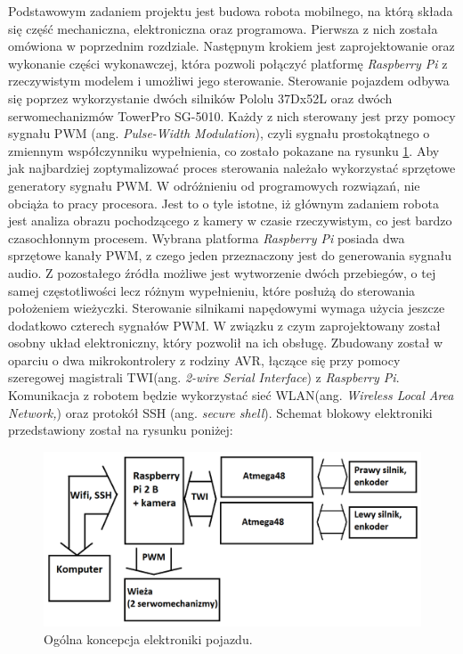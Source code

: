 Podstawowym zadaniem projektu jest budowa robota mobilnego, na którą składa się część mechaniczna, elektroniczna oraz programowa. Pierwsza z nich została omówiona w poprzednim rozdziale. Następnym krokiem jest zaprojektowanie oraz wykonanie części wykonawczej, która pozwoli połączyć platformę \textit{Raspberry Pi} z rzeczywistym modelem i umożliwi jego sterowanie. 
Sterowanie pojazdem odbywa się poprzez wykorzystanie dwóch silników Pololu 37Dx52L oraz dwóch serwomechanizmów TowerPro SG-5010. Każdy z nich sterowany jest przy pomocy sygnału PWM (ang. \textit{Pulse-Width Modulation}), czyli sygnału prostokątnego o zmiennym współczynniku wypełnienia, co zostało pokazane na rysunku \ref{sygnal_PWM}. Aby jak najbardziej zoptymalizować proces sterowania należało wykorzystać sprzętowe generatory sygnału PWM. W odróżnieniu od programowych rozwiązań, nie obciąża to pracy procesora. Jest to o tyle istotne, iż głównym zadaniem robota jest analiza obrazu pochodzącego z kamery w czasie rzeczywistym, co jest bardzo czasochłonnym procesem. Wybrana platforma \textit{Raspberry Pi} posiada dwa sprzętowe kanały PWM, z czego jeden przeznaczony jest do generowania sygnału audio. Z pozostałego źródła możliwe jest wytworzenie dwóch przebiegów, o tej samej częstotliwości lecz różnym wypełnieniu, które posłużą do sterowania położeniem wieżyczki. Sterowanie silnikami napędowymi wymaga użycia jeszcze dodatkowo czterech sygnałów PWM. W związku z czym zaprojektowany został osobny układ elektroniczny, który pozwolił na ich obsługę. Zbudowany został w oparciu o dwa mikrokontrolery z rodziny AVR, łączące się przy pomocy szeregowej magistrali TWI(ang. \textit{2-wire Serial Interface}) z \textit{Raspberry Pi}. Komunikacja z robotem będzie wykorzystać sieć WLAN(ang. \textit{Wireless Local Area Network,}) oraz protokół SSH (ang. \textit{secure shell}). Schemat blokowy elektroniki przedstawiony został na rysunku poniżej:

  \begin{figure}[H]
    \begin{center}
      \includegraphics[scale=0.35]{imgs/idea.png}
 	\caption[Koncepcja elektroniki.]{\small{Ogólna koncepcja elektroniki pojazdu.}}
	\label{sygnal_PWM}
    \end{center}
  \end{figure}  
  
